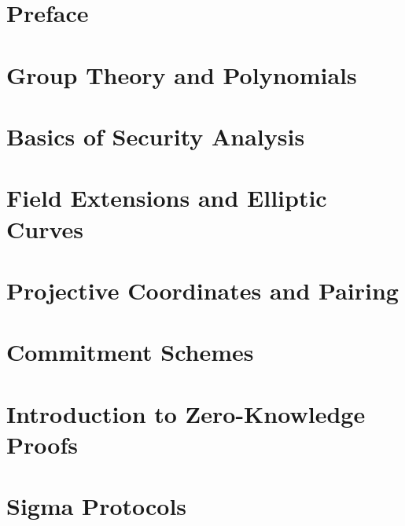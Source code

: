 \documentclass{zkdl-template}
\begin{document}
\newpage

\tableofcontents

\newpage


\section{Preface}



\section{Group Theory and Polynomials}\label{section:math-crypto-1}



\section{Basics of Security Analysis}\label{section:math-crypto-2}



\section{Field Extensions and Elliptic Curves}

\label{section:field_extensions}

\section{Projective Coordinates and Pairing}



\section{Commitment Schemes}\label{section:commitments}



\section{Introduction to Zero-Knowledge Proofs}\label{section:intro-zk}



\section{Sigma Protocols}\label{section:sigma}
\end{document}
